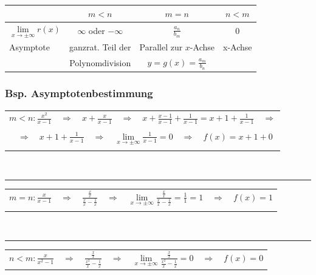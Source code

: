 \renewcommand{\arraystretch}{1.3}
\begin{tabular}{l | c | c | c }
	& $m < n$ 								& $m = n$ 	& $n < m$ \\
	\hline
	$\lim\limits_{x \to \pm \infty} r(x)$ 	& $\infty$ oder $-\infty$ 		& $\frac{a_n}{b_m}$ 				& 0 \\
	Asymptote 								& ganzrat. Teil der 	        & Parallel zur $x$-Achse 		    & x-Achse \\
											& Polynomdivision			    & $y = g(x) = \frac{a_m}{b_n}$ 		& 
\end{tabular}
\renewcommand{\arraystretch}{1}
\vspace{0.4em}

\subsubsection*{Bsp. Asymptotenbestimmung}

\begin{tabular}{l}
    $ \displaystyle{ m < n:   \frac{x^2}{x-1} \quad \Rightarrow \quad x + \frac{x}{x-1} \quad \Rightarrow \quad x + \frac{x-1}{x-1} + \frac{1}{x-1} = x + 1 + \frac{1}{x-1} \quad \Rightarrow}$\\\\
    $ \displaystyle{\quad \Rightarrow \quad x + 1 + \frac{1}{x-1} \quad \Rightarrow \quad \lim\limits_{x \to \pm \infty} \frac{1}{x-1} = 0 \quad \Rightarrow \quad f(x) = x + 1 + 0}$\\\\
\end{tabular}\\
\hrule
\begin{tabular}{l}
    \\  
    $ \displaystyle{ m = n:   \frac{x}{x-1} \quad \Rightarrow \quad \frac{\frac{x}{x}}{\frac{x}{x}-\frac{1}{x}}\quad \Rightarrow \quad \lim\limits_{x \to \pm \infty} \frac{\frac{x}{x}}{\frac{x}{x}-\frac{1}{x}} = \frac{1}{1} = 1\quad \Rightarrow \quad  f(x)= 1}$\\\\
\end{tabular}\\
\hrule
\begin{tabular}{l}
    \\  
    $ \displaystyle{ n < m:   \frac{x}{x^2-1} \quad \Rightarrow \quad \frac{\frac{x}{x}}{\frac{x^2}{x}-\frac{1}{x}} \quad \Rightarrow \quad \lim\limits_{x \to \pm \infty} \frac{\frac{x}{x}}{\frac{x^2}{x}-\frac{1}{x}} = 0 \quad \Rightarrow \quad f(x) = 0}$\\
\end{tabular}


